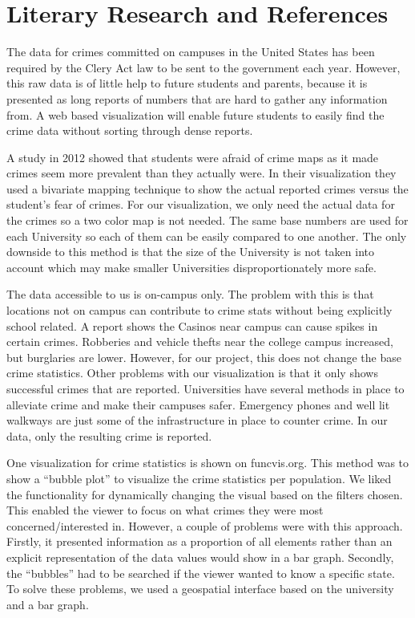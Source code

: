 \documentclass[journal]{vgtc}                %
\begin{document}
\section{Literary Research and References} \label{research}
The data for crimes committed on campuses in the United States has been required by the Clery Act law to be sent to the government each year.  However, this raw data is of little help to future students and parents, because it is presented as long reports of numbers that are hard to gather any information from\cite{lipka-2011}.  A web based visualization will enable future students to easily find the crime data without sorting through dense reports.

A study in 2012 showed that students were afraid of crime maps as it made crimes seem more prevalent than they actually were\cite{fuhrmann-huynh-scholz-2013}. In their visualization they used a bivariate mapping technique to show the actual reported crimes versus the student’s fear of crimes.  For our visualization, we only need the actual data for the crimes so a two color map is not needed.  The same base numbers are used for each University so each of them can be easily compared to one another.  The only downside to this method is that the size of the University is not taken into account which may make smaller Universities disproportionately more safe.

The data accessible to us is on-campus only. The problem with this is that locations not on campus can contribute to crime stats without being explicitly school related.  A report shows the Casinos near campus can cause spikes in certain crimes.  Robberies and vehicle thefts near the college campus increased, but burglaries are lower\cite{Thomas:2011:CRIME}.  However, for our project, this does not change the base crime statistics.
Other problems with our visualization is that it only shows successful crimes that are reported.  Universities have several methods in place to alleviate crime and make their campuses safer\cite{doi:10.1177/0193841X13509815}.  Emergency phones and well lit walkways are just some of the infrastructure in place to counter crime.  In our data, only the resulting crime is reported.

One visualization for crime statistics is shown on funcvis.org\cite{kogan_2013}.  This method was to show a ``bubble plot'' to visualize the crime statistics per population.  We liked the functionality for dynamically changing the visual based on the filters chosen.  This enabled the viewer to focus on what crimes they were most concerned/interested in.  However, a couple of problems were with this approach.  Firstly, it presented information as a proportion of all elements rather than an explicit representation of the data values would show in a bar graph.  Secondly, the ``bubbles'' had to be searched if the viewer wanted to know a specific state.  To solve these problems, we used a geospatial interface based on the university and a bar graph.
\end{document}
